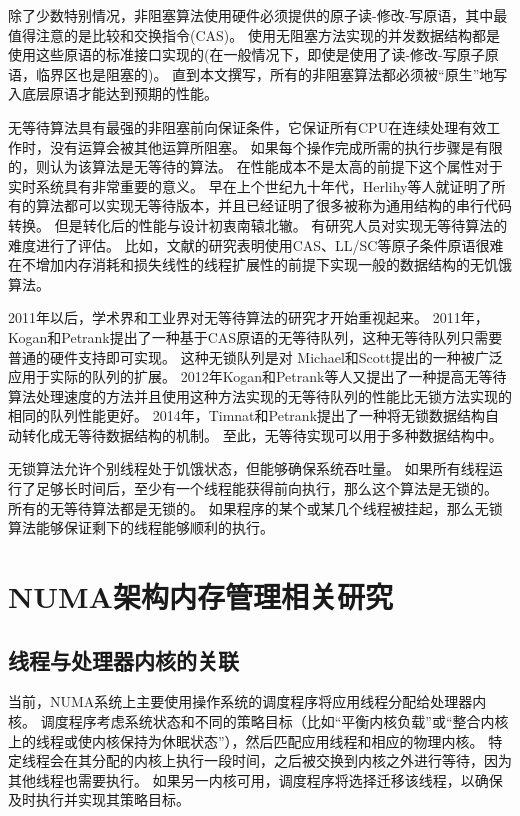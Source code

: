 除了少数特别情况，非阻塞算法使用硬件必须提供的原子读-修改-写原语，其中最值得注意的是比较和交换指令(CAS)。
使用无阻塞方法实现的并发数据结构都是使用这些原语的标准接口实现的(在一般情况下，即使是使用了读-修改-写原子原语，临界区也是阻塞的)。
直到本文撰写，所有的非阻塞算法都必须被“原生”地写入底层原语才能达到预期的性能。

无等待算法具有最强的非阻塞前向保证条件，它保证所有CPU在连续处理有效工作时，没有运算会被其他运算所阻塞。
如果每个操作完成所需的执行步骤是有限的，则认为该算法是无等待的算法。
在性能成本不是太高的前提下这个属性对于实时系统具有非常重要的意义。
早在上个世纪九十年代，Herlihy等人就证明了所有的算法都可以实现无等待版本\cite{herlihy1988impossibility}，并且已经证明了很多被称为通用结构的串行代码转换。
但是转化后的性能与设计初衷南辕北辙。
有研究人员对实现无等待算法的难度进行了评估。
比如，文献\cite{fich2004inherent}的研究表明使用CAS、LL/SC等原子条件原语很难在不增加内存消耗和损失线性的线程扩展性的前提下实现一般的数据结构的无饥饿算法。

2011年以后，学术界和工业界对无等待算法的研究才开始重视起来。
2011年，Kogan和Petrank提出了一种基于CAS原语的无等待队列\cite{kogan2011wait}，这种无等待队列只需要普通的硬件支持即可实现。
这种无锁队列是对 Michael和Scott\cite{michael1996simple}提出的一种被广泛应用于实际的队列的扩展。
2012年Kogan和Petrank\cite{kogan2012methodology}等人又提出了一种提高无等待算法处理速度的方法并且使用这种方法实现的无等待队列的性能比无锁方法实现的相同的队列性能更好。
2014年，Timnat和Petrank\cite{timnat2014practical}提出了一种将无锁数据结构自动转化成无等待数据结构的机制。
至此，无等待实现可以用于多种数据结构中。

无锁算法允许个别线程处于饥饿状态，但能够确保系统吞吐量。
如果所有线程运行了足够长时间后，至少有一个线程能获得前向执行，那么这个算法是无锁的。
所有的无等待算法都是无锁的。
如果程序的某个或某几个线程被挂起，那么无锁算法能够保证剩下的线程能够顺利的执行。

\section{NUMA架构内存管理相关研究}

\subsection{线程与处理器内核的关联}
当前，NUMA系统上主要使用操作系统的调度程序将应用线程分配给处理器内核。 调度程序考虑系统状态和不同的策略目标（比如“平衡内核负载”或“整合内核上的线程或使内核保持为休眠状态”），然后匹配应用线程和相应的物理内核。 特定线程会在其分配的内核上执行一段时间，之后被交换到内核之外进行等待，因为其他线程也需要执行。 如果另一内核可用，调度程序将选择迁移该线程，以确保及时执行并实现其策略目标。

